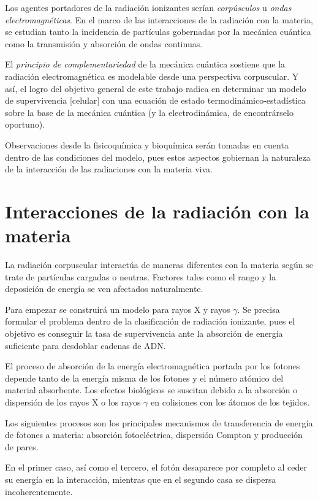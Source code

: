 \documentclass[12pt,letterpaper, oneside]{book}
\begin{document}
	Los agentes portadores de la radiación ionizantes serían \textit{corpúsculos} u \textit{ondas electromagnéticas}. En el marco de las interacciones de la radiación con la materia, se estudian tanto la incidencia de partículas gobernadas por la mecánica cuántica como la transmisión y absorción de ondas continuas.
	
	El \textit{principio de complementariedad} de la mecánica cuántica sostiene que la radiación electromagnética es modelable desde una perspectiva corpuscular. Y así, el logro del objetivo general de este trabajo radica en determinar un modelo de supervivencia [celular] con una ecuación de estado termodinámico-estadística sobre la base de la mecánica cuántica (y la electrodinámica, de encontrárselo oportuno). 
	
	Observaciones desde la fisicoquímica y bioquímica serán tomadas en cuenta dentro de las condiciones del modelo, pues estos aspectos gobiernan la naturaleza de la interacción de las radiaciones con la materia viva\cite{Bleehen.2007}. 
	
	\section{Interacciones de la radiación con la materia}
	La radiación corpuscular interactúa de maneras diferentes con la materia según se trate de partículas cargadas o neutras. Factores tales como el rango y la deposición de energía se ven afectados naturalmente. 
	
	Para empezar se construirá un modelo para rayos X y rayos $\gamma$. Se precisa formular el problema dentro de la clasificación de radiación ionizante, pues el objetivo es conseguir la tasa de supervivencia ante la absorción de energía suficiente para desdoblar cadenas de ADN. 
	
	El proceso de absorción de la energía electromagnética portada por los fotones depende tanto de la energía misma de los fotones y el número atómico del material absorbente\cite{IAEA.2010}. Los efectos biológicos se suscitan debido a la absorción o dispersión de los rayos X o los rayos $\gamma$ en colisiones con los átomos de los tejidos\cite{IAEA.2010, Mayles.2007}. 
	
	Los siguientes procesos son los principales mecanismos de transferencia de energía de fotones a materia: absorción fotoeléctrica, dispersión Compton y producción de pares\cite{IAEA.2010}. 
	
	En el primer caso, así como el tercero, el fotón desaparece por completo al ceder su energía en la interacción, mientras que en el segundo casa se dispersa incoherentemente\cite{IAEA.2005}.
	 
\end{document}
